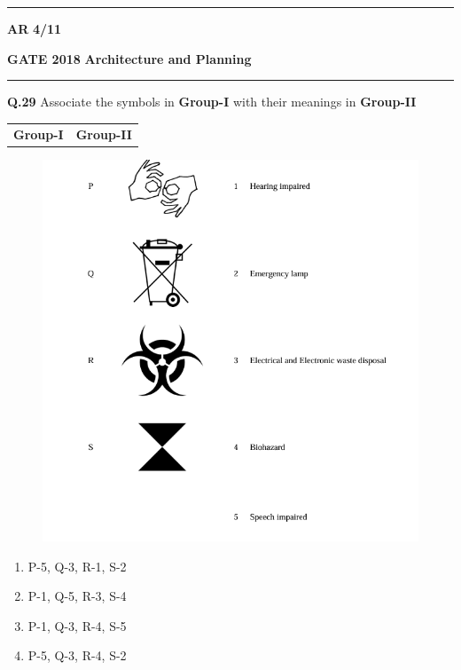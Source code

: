 \documentclass{article}
\begin{document}
 \noindent
\hrule \vspace{0.0875CM} \textbf{AR} \hfill  \textbf{4/11}

 \newpage
 
\noindent
\textbf{GATE 2018} \hfill \textbf{Architecture and Planning}
\vspace{0.0012cm} \hrule
\vspace{0.5cm}
\textbf{Q.29} \quad Associate the symbols in \textbf{Group-I} with their meanings in \textbf{Group-II}

\vspace{0.5cm}

\begin{tabular}{p{7cm} p{7cm}}
\centering \textbf{Group-I} & \centering \textbf{Group-II} \\
\end{tabular}


\begin{figure} [h!]
    \centering
    \includegraphics[width=1\linewidth]{Figs/29.png}
  \end{figure}

 

\begin{multicols}{2}
\begin{enumerate}[label=(\Alph*),leftmargin=1cm]
\item P-5, Q-3, R-1, S-2
\item P-1, Q-5, R-3, S-4
\item P-1, Q-3, R-4, S-5
\item P-5, Q-3, R-4, S-2
\end{enumerate}
\end{multicols}
\end{document}
